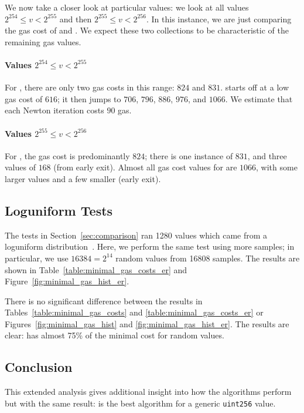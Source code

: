 We now take a closer look at particular values:
we look at all values $2^{254} \le v < 2^{255}$
and then $2^{255} \le v < 2^{256}$.
In this instance, we are just comparing the gas cost of \UnrolledThree{}
and \WhileOne{}.
We expect these two collections to be characteristic
of the remaining gas values.

\paragraph{Values $2^{254} \le v < 2^{255}$}
For \UnrolledThree{}, there are only two gas costs in this range:
$824$ and $831$.
\WhileOne{} starts off at a low gas cost of $616$;
it then jumps to $706$, $796$, $886$, $976$, and $1066$.
We estimate that each Newton iteration costs $90$ gas.

\paragraph{Values $2^{255} \le v < 2^{256}$}
For \UnrolledThree{}, the gas cost is predominantly $824$;
there is one instance of $831$, and three values of $168$ (from early exit).
Almost all gas cost values for \WhileOne{} are $1066$,
with some larger values and a few smaller (early exit).




\subsection{Loguniform Tests}
\label{app:loguniform}

The tests in Section~\ref{sec:comparison} ran 1280 values
which came from a loguniform distribution~\cite{ScipyLoguniform}.
Here, we perform the same test using more samples;
in particular, we use $16384 = 2^{14}$ random values from 16808 samples.
The results are shown in Table~\ref{table:minimal_gas_costs_er}
and Figure~\ref{fig:minimal_gas_hist_er}.

There is no significant difference between the results in 
Tables~\ref{table:minimal_gas_costs} and \ref{table:minimal_gas_costs_er}
or Figures~\ref{fig:minimal_gas_hist} and \ref{fig:minimal_gas_hist_er}.
The results are clear:
\UnrolledThree{} has almost 75\% of the minimal cost for random values.




\subsection{Conclusion}

This extended analysis gives additional insight into how the algorithms
perform but with the same result:
\UnrolledThree{} is the best algorithm
for a generic \texttt{uint256} value.
